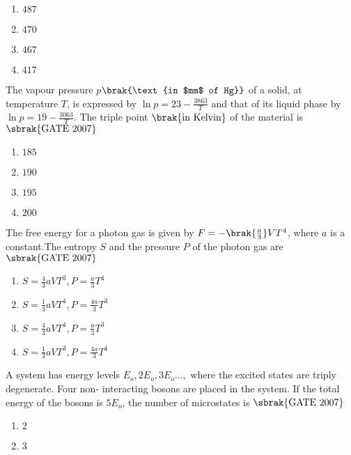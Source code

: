 \begin{multicols}{4}
 \begin{enumerate}
    \item $487$
    \item $470$
    \item $467$
    \item $417$
\end{enumerate}
\end{multicols}
\item The vapour pressure $p$$\brak{\text{in  $mm$  of Hg}}$ of a solid, at temperature $T$, is expressed by $\ln{p}=23-\frac{3863}{T}$ and that of its liquid phase by $\ln{p}= 19-\frac{3063}{T}$. The triple point $\brak{\text{in  Kelvin}}$ of the material is \hfill{$\sbrak{\text{GATE 2007}}$} 
\begin{multicols}{4}
\begin{enumerate}
    \item $185$
    \item $190$
    \item $195$
    \item $200$
\end{enumerate}
\end{multicols}
\item The free energy for a photon gas is given by $F = -\brak{\frac{a}{3}}VT^4$, where $a$ is a constant.The entropy $S$ and the pressure $P$ of the photon gas are \hfill{$\sbrak{\text{GATE 2007}}$} 
\begin{multicols}{2}
\begin{enumerate}
    \item $S=\frac{4}{3}aVT^3, P=\frac{a}{3}T^4$
    \item $S=\frac{1}{3}aVT^4, P=\frac{4a}{3}T^3$
    \item $S=\frac{4}{3}aVT^4, P=\frac{a}{3}T^3$
    \item $S=\frac{1}{3}aVT^3, P=\frac{4a}{3}T^4$
\end{enumerate}
\end{multicols}
\item A system has energy levels $E_o,2E_o,3E_o\dots,$ where the excited states are triply degenerate. Four non- interacting bosons are placed in the system. If the total energy of the bosons is $5E_o$, the number of microstates is \hfill{$\sbrak{\text{GATE 2007}}$} 
\begin{multicols}{4}
\begin{enumerate}
    \item $2$
    \item $3$

\end{enumerate}
\end{multicols}$$
